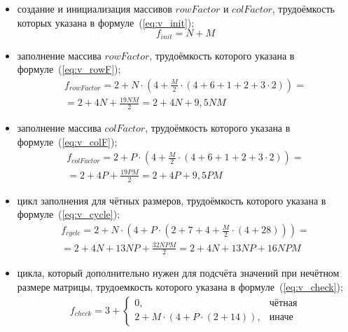 \begin{itemize}[label=---]
	\item создание и инициализация массивов $rowFactor$ и $colFactor$, трудоёмкость которых указана в формуле~(\ref{eq:v_init});
	\begin{equation}
		\label{eq:v_init}
		f_{init} = N + M
	\end{equation}
	\item заполнение массива $rowFactor$, трудоёмкость которого указана в формуле~(\ref{eq:v_rowF});
	\begin{equation}
		\label{eq:v_rowF}
		\begin{gathered}
			f_{rowFactor} = 2 + N \cdot (4 + \frac{M}{2} \cdot (4 + 6 + 1 + 2 + 3 \cdot 2)) = \\
			= 2 + 4N + \frac{19NM}{2} = 2 + 4N + 9,5NM
		\end{gathered} 
	\end{equation}
	\item заполнение массива $colFactor$, трудоёмкость которого указана в формуле~(\ref{eq:v_colF});
	\begin{equation}
		\label{eq:v_colF}
		\begin{gathered}
			f_{colFactor} = 2 + P \cdot (4 + \frac{M}{2} \cdot (4 + 6 + 1 + 2 + 3 \cdot 2)) = \\
			= 2 + 4P + \frac{19PM}{2} = 2 + 4P + 9,5PM
		\end{gathered}  
	\end{equation}
	\item цикл заполнения для чётных размеров, трудоёмкость которого указана в формуле~(\ref{eq:v_cycle});
	\begin{equation}
		\label{eq:v_cycle}
		\begin{gathered}
			f_{cycle} = 2 + N \cdot (4 + P \cdot (2 + 7 + 4 + \frac{M}{2} \cdot (4 + 28))) = \\
			= 2 + 4N + 13NP + \frac{32NPM}{2}  = 2 + 4N + 13NP + 16NPM 
		\end{gathered}
	\end{equation}
	\item цикла, который дополнительно нужен для подсчёта значений при нечётном размере матрицы, трудоемкость которого указана в формуле~(\ref{eq:v_check});
	\begin{equation}
		\label{eq:v_check}
		\begin{gathered}
			f_{check} = 3 + 
			\begin{cases}
				0, & \text{чётная} \\
				2 + M \cdot (4 + P \cdot (2 + 14)), & \text{иначе}
			\end{cases}
		\end{gathered}  
	\end{equation}
\end{itemize}

